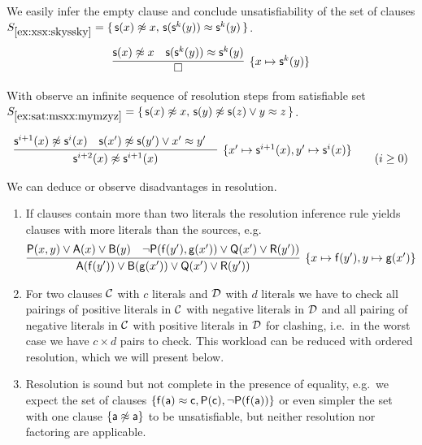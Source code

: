 \begin{example}\label{ex:xsx:skyssky}
	We easily infer the empty clause and 
	conclude unsatisfiability of the set of clauses
	$S_{\ref{ex:xsx:skyssky}} = \{\,
	{ {\mathsf s}(x)\not\approx x},\, 
	{ {\mathsf s}({\mathsf s}^k(y))\approx{\mathsf s}^k(y) }
	\,\}$.
	\begin{gather*}
	\infer[\{ x\mapsto\msucc^k(y) \}]
	{
		\square
	}
	{
		\msucc(x)\mNE x & \msucc(\msucc^k(y))\mEQ\msucc^k(y)
	}
	\end{gather*}
\end{example}

\begin{example}\label{ex:sat:msxx:mymzyz}
	With observe an infinite sequence of resolution steps from satisfiable set 
	$S_{\ref{ex:sat:msxx:mymzyz}} = \{\, {\mathsf s}(x)\not\approx x,\, {\mathsf s}(y)\not\approx{\mathsf s}(z) \lor y\approx z
	\,\}$.
	
	\begin{gather*}
	\infer
	[\{ x'\mapsto\msucc^{i+1}(x), y'\mapsto\msucc^{i}(x)\}]
	{
		\msucc^{i+2}(x) \mNE\msucc^{i+1}(x)  
	}{
		\msucc^{i+1}(x)\mNE \msucc^i(x) & \msucc(x')\mNE\msucc(y')\lor x'\mEQ y'
		&
	}
	\tag{$i\geq 0$}
	\end{gather*}
\end{example}



We can deduce or observe disadvantages in resolution. 

\begin{enumerate}
	\item If clauses contain more than two literals the resolution inference rule yields clauses with more literals than the sources, e.g.
	\begin{gather*}
		\infer[\{ x\mapsto\mf(y'), y\mapsto\mg(x') \}]
		{\mA(\mf(y'))\lor\mB(\mg(x')) \lor \mQ(x')\lor\mR(y'))}
		{\mP(x,y)\lor\mA(x)\lor\mB(y) & \lnot\mP(\mf(y'),\mg(x'))\lor\mQ(x')\lor\mR(y'))}
	\end{gather*}
	
	\item For two clauses ${\mathcal C}$ with $c$ literals and ${\mathcal D}$ with $d$ literals
	we have to check all pairings 
	of positive literals in ${\mathcal C}$ 
	with negative literals in ${\mathcal D}$ 
	and all pairing of negative literals in ${\mathcal C}$ 
	with positive literals in ${\mathcal D}$ for clashing,
	i.e.~in the worst case we have $c\times d$ pairs to check.
	This workload can be reduced with ordered resolution, which we will present below.
	
	\item Resolution is sound but not complete in the presence of equality,
	e.g.~we expect the set of clauses $\{ 
		{\mathsf f}({\mathsf a}) \approx {\mathsf c}, {\mathsf P}({\mathsf c}), \lnot{\mathsf P}({\mathsf f}({\mathsf a}))
	\}$ or even simpler the set with one clause $\{ {\mathsf a}\not\approx{\mathsf a} \}$ to be unsatisfiable, but neither resolution nor factoring
	are applicable.
\end{enumerate}

